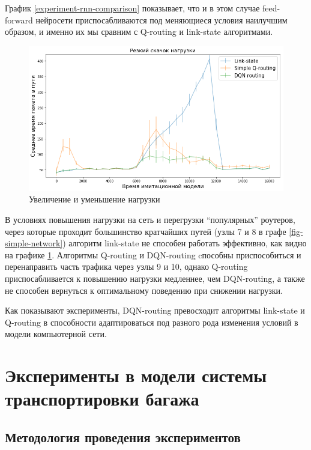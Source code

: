 \documentclass[specification, annotation]{itmo-student-thesis}
\begin{document}
График \ref{experiment-rnn-comparison} показывает, что и в этом случае
feed-forward нейросети приспосабливаются под меняющиеся условия наилучшим
образом, и именно их мы сравним с Q-routing и link-state алгоритмами.

\begin{figure}[!h]
  \caption{Увеличение и уменьшение нагрузки}\label{experiment-peak-load}
  \centering
  \includegraphics[scale=0.6]{experiment-peak-load}
\end{figure}

В условиях повышения нагрузки на сеть и перегрузки ``популярных'' роутеров,
через которые проходит большинство кратчайших путей (узлы 7 и 8 в графе
\ref{fig-simple-network}) алгоритм link-state не способен работать эффективно,
как видно на графике \ref{experiment-peak-load}. Алгоритмы Q-routing и
DQN-routing cпособны приспособиться и перенаправить часть трафика через узлы 9 и
10, однако Q-routing приспосабливается к повышению нагрузки медленнее, чем
DQN-routing, а также не способен вернуться к оптимальному поведению при снижении
нагрузки.

Как показывают эксперименты, DQN-routing превосходит алгоритмы link-state и
Q-routing в способности адаптироваться под разного рода изменения условий в
модели компьютерной сети.

\section{Эксперименты в модели системы транспортировки багажа}\label{experiments:conveyors}

\subsection{Методология проведения экспериментов}
\end{document}
